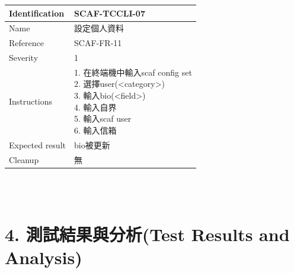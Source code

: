 \documentclass{report}
\begin{document}
\begin{tabularx}{\textwidth}{
  |p{}%
  |p{}|%
  }
  \hline
  \centering Identification &  SCAF-TCCLI-07 \\
  \hline
  \centering Name & 設定個人資料 \\
  \hline
  \centering Reference & SCAF-FR-11 \\
  \hline
  \centering Severity & 1 \\
  \hline
  \centering Instructions & 
  \makecell[l]{
    1. 在終端機中輸入scaf config set  \\
    2. 選擇user(<category>) \\
    3. 輸入bio(<field>) \\
    4. 輸入自界 \\
    5. 輸入scaf user \\
    6. 輸入信箱  \\
  }\\
  \hline
  \centering Expected result & bio被更新 \\
  \hline
  \centering Cleanup & 無 \\
  \hline
\end{tabularx}
\\
\newline
\\

\section*{4. 測試結果與分析(Test Results and Analysis)}
\end{document}
